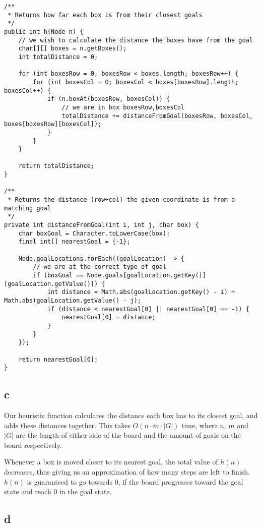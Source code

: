 \documentclass[12pt]{article}
\begin{document}
\begin{lstlisting}
/**
 * Returns how far each box is from their closest goals
 */
public int h(Node n) {
    // we wish to calculate the distance the boxes have from the goal
    char[][] boxes = n.getBoxes();
    int totalDistance = 0;

    for (int boxesRow = 0; boxesRow < boxes.length; boxesRow++) {
        for (int boxesCol = 0; boxesCol < boxes[boxesRow].length; boxesCol++) {
            if (n.boxAt(boxesRow, boxesCol)) {
                // we are in box boxesRow,boxesCol
                totalDistance += distanceFromGoal(boxesRow, boxesCol, boxes[boxesRow][boxesCol]);
            }
        }
    }

    return totalDistance;
}

/**
 * Returns the distance (row+col) the given coordinate is from a matching goal
 */
private int distanceFromGoal(int i, int j, char box) {
    char boxGoal = Character.toLowerCase(box);
    final int[] nearestGoal = {-1};

    Node.goalLocations.forEach((goalLocation) -> {
        // we are at the correct type of goal
        if (boxGoal == Node.goals[goalLocation.getKey()][goalLocation.getValue()]) {
            int distance = Math.abs(goalLocation.getKey() - i) + Math.abs(goalLocation.getValue() - j);
            if (distance < nearestGoal[0] || nearestGoal[0] == -1) {
                nearestGoal[0] = distance;
            }
        }
    });

    return nearestGoal[0];
}
\end{lstlisting}

\subsection{c}
\label{sub:c}

Our heuristic function calculates the distance each box has to its closest goal, and adds these distances together. This takes $O(n \cdot m \cdot |G|)$ time, where $n$, $m$ and $|G|$ are the length of either side of the board and the amount of goals on the board respectively.

Whenever a box is moved closer to its nearest goal, the total value of $h(n)$ decreases, thus giving us an approximation of how many steps are left to finish. $h(n)$ is guaranteed to go towards 0, if the board progresses toward the goal state and reach 0 in the goal state.

\subsection{d}
\label{sub:d}
\end{document}
